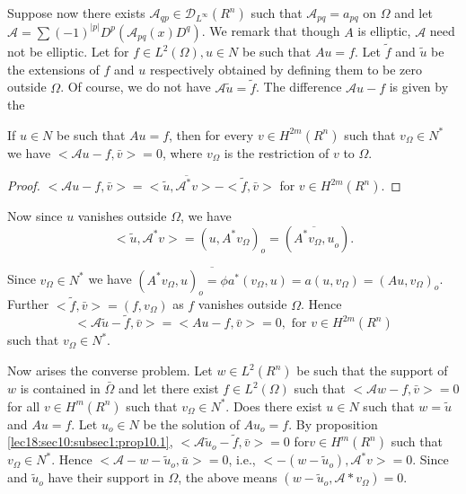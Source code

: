 Suppose now there exists $\mathscr{A}_{qp} \in
\mathscr{D}_{L^\infty}(R^n)$ such that $\mathscr{A}_{pq} = a_{pq}$ on
$\Omega$ and let $\mathscr{A} = \sum (-1)^{|p|} D^p
(\mathscr{A}_{pq}(x) D^q)$. We remark that though $A$ is elliptic,
$\mathscr{A}$ need not be elliptic. Let for $f \in L^2 (\Omega
), u \in N$ be such that $Au = f$. Let $\tilde{f}$ and
$\tilde{u}$ be the extensions of $f$ and $u$ respectively obtained by
defining them to be zero outside $\Omega$. Of course, we do not have
$\mathscr{A}\tilde{u} = \tilde{f}$. The difference $\mathscr{A}u-f$ is
given by the  
\begin{proposition}\label{lec18:sec10:subsec1:prop10.1}%
  If $u \in N$ be such that $Au = f$, then for every $v
  \in H^{2m} (R^n)$ such that $v_\Omega \in N^*$ we have
  $< \mathscr{A} u - f, \bar{v} > = 0$, where $v_\Omega$ is the
  restriction of $v$ to $\Omega$.  
\end{proposition}

\begin{proof}
  $< \mathscr{A} u -f, \bar{v}> = < \tilde{u}, \overline{\mathscr{A}^*
    v}  > - <
  \tilde{f}, \bar{v}>$ for $v \in H^{2m} (R^n)$.  
\end{proof}

Now since $u$ vanishes outside $\Omega$, we have
$$
< \tilde{u}, \mathscr{A}^* v > = (u, A^* v_\Omega )_o = (\overline{A^*
  v_\Omega , u}_o).  
$$

Since $v_{\Omega} \in N^*$ we have $\overline{(A^* v_{\Omega},
  u)_o = \phi a^*(v_{\Omega}, u)} = a(u, v_{\Omega}) = (Au,
v_{\Omega})_o$. Further $< \tilde{f}, \bar{v} > = (f, v_{\Omega})$ as
$f$ vanishes outside $\Omega$. Hence 
$$
< \mathscr{A} \tilde{u} - \tilde{f}, \bar{v} > = < Au - f, \bar{v} > =
0, \text{ for } v \in H^{2m} (R^n) 
$$
such that $v_{\Omega} \in N^*$. 

Now arises the converse problem. Let $w \in L^2 (R^n)$ be such
that the support of $w$ is contained in $\bar{\Omega}$ and let there
exist $f \in L^2 (\Omega)$ such that $< \mathscr{A} w - f,
\bar{v} > = 0$ for all $v \in H^m (R^n)$ such that $v_{\Omega}
\in N^*$. Does there exist $u \in N$ such that $w =
\tilde{u}$ and $Au = f$. Let $u_o \in N$ be the solution of
$Au_o = f$. By proposition \ref{lec18:sec10:subsec1:prop10.1}, $< \mathscr{A} \tilde{u}_o -
\tilde{f}, \bar{v} > = 0$ for\pageoriginale $v \in H^m (R^n)$ such that
$v_{\Omega} \in N^*$. Hence $ < \mathscr{A} - w- \tilde{u}_o,
\bar{u} > = 0$, i.e., $ < - (w -\tilde{u}_o), \mathscr{A}^* v > =
0$. Since and $\tilde{u}_o$ have their support in $\Omega$, the above
means $(w-\tilde{u}_o, \mathscr{A}* v_{\Omega}) = 0$.  

